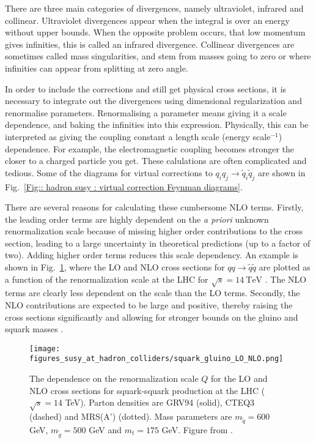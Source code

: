 \documentclass[twoside,english]{uiofysmaster}
\begin{document}
{There are three main categories of divergences, namely ultraviolet, infrared and collinear. Ultraviolet divergences appear when the integral is over an energy without upper bounds. When the opposite problem occurs, that low momentum gives infinities, this is called an infrared divergence. Collinear divergences are sometimes called mass singularities, and stem from masses going to zero or where infinities can appear from splitting at zero angle.





In order to include the corrections and still get physical cross sections, it is necessary to integrate out the divergences using dimensional regularization and renormalise parameters. Renormalising a parameter means giving it a scale dependence, and baking the infinities into this expression. Physically, this can be interpreted as giving the coupling constant a length scale (energy scale$^{-1}$) dependence. For example, the electromagnetic coupling becomes stronger the closer to a charged particle you get. These calulations are often complicated and tedious. Some of the diagrams for virtual corrections to $q_iq_j \rightarrow \widetilde{q}_i \widetilde{q}_j$ are shown in Fig.~\ref{Fig:: hadron susy : virtual correction Feynman diagrams}.

There are several reasons for calculating these cumbersome NLO terms. Firstly, the leading order terms are highly dependent on the \textit{a priori} unknown renormalization scale because of missing higher order contributions to the cross section, leading to a large uncertainty in theoretical predictions (up to a factor of two). Adding higher order terms reduces this scale dependency. An example is shown in Fig.~\ref{Fig:: hadron susy : LO vs NLO beenakker}, where the LO and NLO cross sections for $qq \rightarrow \widetilde{q} \widetilde{q}$ are plotted as a function of the renormalization scale at the LHC for $\sqrt{s}=14~\mathrm{TeV}$ \cite{Beenakker:1996ch}. The NLO terms are clearly less dependent on the scale than the LO terms.  Secondly, the NLO contributions are expected to be large and positive, thereby raising the cross sections significantly and allowing for stronger bounds on the gluino and squark masses \cite{Beenakker:1996ch}.

\begin{figure}
\centering
\texttt{[image: figures\_susy\_at\_hadron\_colliders/squark\_gluino\_LO\_NLO.png]}
\caption[Renormalization scale dependence of LO and NLO cross sections]{The dependence on the renormalization scale $Q$ for the LO and NLO cross sections for squark-squark production at the LHC ($\sqrt{s}=14$ TeV). Parton densities are GRV94 (solid), CTEQ3 (dashed) and MRS(A') (dotted). Mass parameters are $m_{\widetilde{q}}=600$ GeV, $m_{\widetilde{g}}=500$ GeV and $m_t=175$ GeV. Figure from \cite{Beenakker:1996ch}.}
\label{Fig:: hadron susy : LO vs NLO beenakker}
\end{figure}

}
\end{document}
